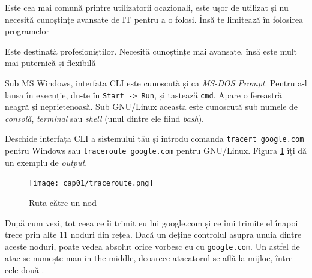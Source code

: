 \begin{itemize}
	\begin{item} 
	\end{item}
	
	\begin{item}
	\end{item}
\end{itemize}
Sub MS Windows, interfața CLI este cunoscută și ca \textsl{MS-DOS Prompt}. Pentru
a-l lansa în execuție, du-te în \texttt{Start -> Run}, și tastează \texttt{cmd}.
Apare o fereastră neagră și neprietenoasă. Sub GNU/Linux aceasta este
cunoscută sub numele de \textsl{consolă}, \textsl{terminal} sau
\textsl{shell} (unul dintre ele fiind \textsl{bash}).

Deschide interfața CLI a sistemului tău și introdu comanda
\texttt{tracert google.com} pentru Windows sau \texttt{traceroute google.com} pentru 
GNU/Linux. Figura \ref{fig:cli traceroute} îţi dă un exemplu de \textsl{output}.

\begin{figure}[ht!]
  \centering
    \texttt{[image: cap01/traceroute.png]}
  \caption{Ruta către un nod}
  \label{fig:cli traceroute}
\end{figure}

După cum vezi, tot ceea ce îi trimit eu lui google.com și ce îmi trimite
el înapoi trece prin alte 11 noduri din rețea. Dacă un 
deține controlul asupra unuia dintre aceste noduri,
poate vedea absolut orice {\glqq}vorbesc{\grqq} eu cu \texttt{google.com}. Un astfel de atac
se numește \href{http://en.wikipedia.org/wiki/Man-in-the-middle_attack}{man in the middle},
deoarece atacatorul se află la mijloc, între
cele două .

